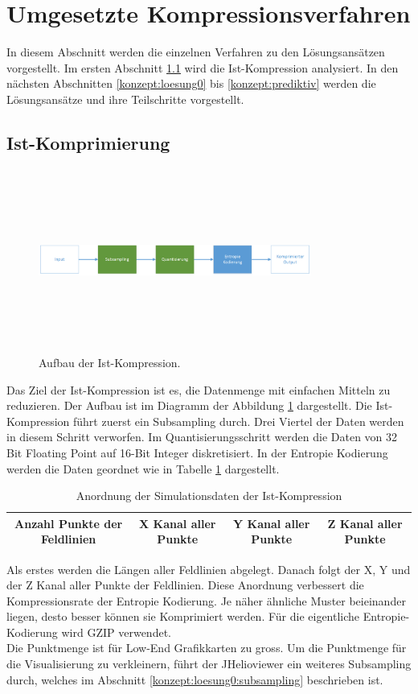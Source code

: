 \section{Umgesetzte Kompressionsverfahren} \label{konzept}
In diesem Abschnitt werden die einzelnen Verfahren zu den Lösungsansätzen vorgestellt. Im ersten Abschnitt \ref{konzept:ist-komprimierung} wird die Ist-Kompression analysiert. In den nächsten Abschnitten \ref{konzept:loesung0} bis \ref{konzept:prediktiv} werden die Lösungsansätze und ihre Teilschritte vorgestellt.

\subsection{Ist-Komprimierung} \label{konzept:ist-komprimierung}
\begin{figure}[!htbp]
	\center
	\includegraphics[width=0.8\textwidth,height=6cm,keepaspectratio]{./pictures/konzept/ist/aufbau.png}
	\caption{Aufbau der Ist-Kompression.}
	\label{konzept:ist:aufbau:diagramm}
\end{figure}
Das Ziel der Ist-Kompression ist es, die Datenmenge mit einfachen Mitteln zu reduzieren. Der Aufbau ist im Diagramm der Abbildung \ref{konzept:ist:aufbau:diagramm} dargestellt. Die Ist-Kompression führt zuerst ein Subsampling durch. Drei Viertel der Daten werden in diesem Schritt verworfen. Im Quantisierungsschritt werden die Daten von 32 Bit Floating Point auf 16-Bit Integer diskretisiert. In der Entropie Kodierung werden die Daten geordnet wie in Tabelle \ref{konzept:ist:entropie} dargestellt.
\begin{table}[!htbp]
	\center
	\begin{tabular}{|c|c|c|c|}
	\hline
	Anzahl Punkte der Feldlinien & X Kanal aller Punkte & Y Kanal aller Punkte & Z Kanal aller Punkte \\\hline
	\end{tabular}
	\caption{Anordnung der Simulationsdaten der Ist-Kompression}
	\label{konzept:ist:entropie}
\end{table}
Als erstes werden die Längen aller Feldlinien abgelegt. Danach folgt der X, Y und der Z Kanal aller Punkte der Feldlinien. Diese Anordnung verbessert die Kompressionsrate der Entropie Kodierung. Je näher ähnliche Muster beieinander liegen, desto besser können sie Komprimiert werden. Für die eigentliche Entropie-Kodierung wird GZIP verwendet.\\
Die Punktmenge ist für Low-End Grafikkarten zu gross. Um die Punktmenge für die Visualisierung zu verkleinern, führt der JHelioviewer ein weiteres Subsampling durch, welches im Abschnitt \ref{konzept:loesung0:subsampling} beschrieben ist.

